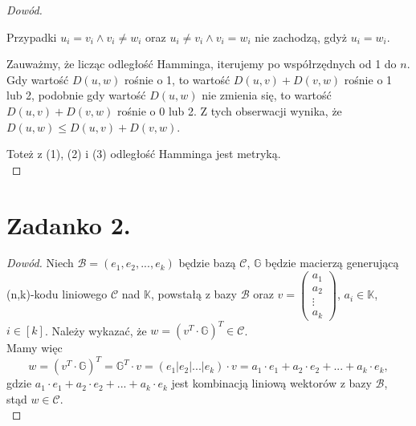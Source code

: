 \documentclass[10pt]{article} %
\begin{document}
\begin{proof}[Dowód]
\begin{enumerate}
\begin{enumerate}
\begin{enumerate}
\end{enumerate}
Przypadki $u_i = v_i \wedge v_i \neq w_i$ oraz $u_i \neq v_i \wedge v_i = w_i$ nie zachodzą, gdyż $u_i = w_i$. 
\end{enumerate}
Zauważmy, że licząc odległość Hamminga, iterujemy po współrzędnych od 1 do $n$. Gdy wartość $D(u,w)$ rośnie o 1, to wartość $D(u,v) +D(v,w)$ rośnie o 1 lub 2, podobnie gdy wartość $D(u,w)$ nie zmienia się, to wartość $D(u,v) +D(v,w)$ rośnie o 0 lub 2. Z tych obserwacji wynika, że $D(u,w) \leq D(u,v) +D(v,w)$.
\end{enumerate}
Toteż z (1), (2) i (3) odległość Hamminga jest metryką.\\
\end{proof}


\newpage
\section*{Zadanko 2.}
\begin{proof}[Dowód] 
Niech $\mathcal{B} = (e_1, e_2, ..., e_k)$ będzie bazą $\mathcal{C}$, $\mathbb{G}$ będzie macierzą generującą (n,k)-kodu liniowego $\mathcal{C}$ nad $\mathbb{K}$, powstałą z bazy $\mathcal{B}$ oraz $v = \begin{pmatrix} a_1\\ a_2\\ \vdots \\ a_k\end{pmatrix}$, $a_i \in \mathbb{K}$, $i \in [k]$. Należy wykazać, że $ w =(v^T \cdot \mathbb{G})^T \in \mathcal{C}$.\\
Mamy więc $$ w =(v^T \cdot \mathbb{G})^T =  \mathbb{G}^T \cdot v = (e_1 | e_2 | ... | e_k) \cdot v = a_1\cdot e_1 + a_2\cdot e_2 + ... + a_k\cdot e_k,$$ gdzie $a_1\cdot e_1 + a_2\cdot e_2 + ... + a_k\cdot e_k$ jest kombinacją liniową wektorów z bazy $\mathcal{B}$, stąd $w \in \mathcal{C}$.\\
\end{proof}

\newpage
\end{document}
